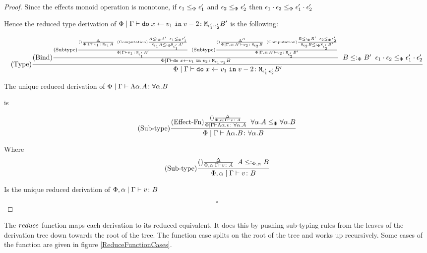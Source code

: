 \documentclass{Report}
\begin{document}
\begin{proof}
    Since the effects monoid operation is monotone, if $\epsilon_1\leq_{\Phi}\epsilon_1'$ and $\epsilon_2\leq_{\Phi}\epsilon_2'$ then $\epsilon_1\cdot\epsilon_2 \leq_{\Phi} \epsilon_1'\cdot\epsilon_2'$

    Hence the reduced type derivation of $\Phi\mid\Gamma \vdash \texttt{do}\; x \leftarrow v_1 \;\texttt{in}\; v-2 \colon \texttt{M}_{\epsilon_1'\cdot\epsilon_2'}{B'}$ is the following:

    \begin{equation}
        (\text{Type}) \frac{
            (\text{Bind}) \frac{
                (\text{Subtype}) \frac{ (\text{}) \frac{ \Delta }{ \Phi\mid\Gamma \vdash v_1 \colon \texttt{M}_{\epsilon_1}{A} } \;\; (\text{Computation}) \frac{ A \leq:_\Phi A' \;\; \epsilon_1 \leq_{\Phi} \epsilon_1' }{ \texttt{M}_{\epsilon_1}{A}\leq:_\Phi{\texttt{M}_{\epsilon_1'}{A'}} } }{ \Phi\mid \Gamma \vdash v_1 \colon \texttt{M}_{\epsilon_1'}{A'} }
                \;\;
                (\text{Subtype}) \frac{ (\text{}) \frac{ \Delta'' }{ \Phi\mid \Gamma, x:A' \vdash v_2 \colon \texttt{M}_{\epsilon_2}{B} } \;\; (\text{Computation}) \frac{ B \leq:_\Phi B' \;\; \epsilon_2 \leq_{\Phi} \epsilon_2' }{ \texttt{M}_{\epsilon_2}{B}\leq:_\Phi{\texttt{M}_{\epsilon_2'}{B'}} } }{ \Phi\mid \Gamma, x:A' \vdash v_2 \colon \texttt{M}_{\epsilon_2'}{B'} }
            }{
                \Phi\mid\Gamma \vdash \texttt{do}\; x \leftarrow v_1 \;\texttt{in}\; v_2 \colon \texttt{M}_{\epsilon_1\cdot\epsilon_2}{B}
            }
            \;\;
            B\leq:_\Phi B'
            \;\;
            \epsilon_1\cdot\epsilon_2\leq_{\Phi}\epsilon_1'\cdot\epsilon_2'
        }{
            \Phi\mid\Gamma \vdash \texttt{do}\; x \leftarrow v_1 \;\texttt{in}\; v-2 \colon \texttt{M}_{\epsilon_1'\cdot\epsilon_2'}{B'}
        }
    \end{equation}


    The unique reduced derivation of $\Phi\mid\Gamma \vdash \Lambda \alpha. A \colon \forall \alpha. B$

    is 

    \begin{equation}
        (\text{Sub-type}) \frac{
            (\text{Effect-Fn}) \frac{
                (\text{}) \frac{\Delta}{\Phi,\alpha\mid\Gamma \vdash v \colon A}
            }{
                \Phi\mid\Gamma \vdash \Lambda \alpha. v \colon \forall \alpha. A
            }
            \;\;
            \forall \alpha. A\leq_{\Phi}\forall \alpha. B
        }{
            \Phi\mid\Gamma \vdash \Lambda \alpha. B \colon \forall \alpha. B
        }
    \end{equation}

    Where
    \begin{eqnarray}
        (\text{Sub-type}) \frac{
            (\text{}) \frac{\Delta}{\Phi,\alpha\mid\Gamma \vdash v \colon A}
            \;\;
            A\leq:_{\Phi, \alpha} B
        }{
            \Phi,\alpha\mid\Gamma \vdash v \colon B
        }
    \end{eqnarray}

    Is the unique reduced derivation of $\Phi,\alpha\mid\Gamma \vdash v \colon B$


    $$\square$$
\end{proof}


The $reduce$ function maps each derivation to its reduced equivalent. It does this by pushing sub-typing rules from the leaves of the derivation tree down towards the root of the tree. The function case splits on the root of the tree and works up recursively. Some cases of the function are given in figure \ref{ReduceFunctionCases}. 
\end{document}
